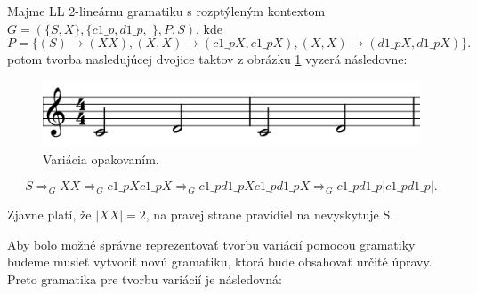 \begin{example}
Majme LL 2-lineárnu gramatiku s rozptýleným kontextom \\ $G = (\{S,X\},\{c1\_p, d1\_p, |\}, P, S)$, kde $$P = \{(S) \rightarrow (XX), (X,X) \rightarrow (c1\_pX, c1\_pX), (X,X) \rightarrow (d1\_pX, d1\_pX)\}.$$ potom tvorba nasledujúcej dvojice taktov z obrázku \ref{fig:Priklad1} vyzerá následovne:
\begin{figure}[H]
    \centering
    \includegraphics[scale=0.4]{thesis/obrazky-figures/Priklad1.png}
    \caption{Variácia opakovaním.}
    \label{fig:Priklad1}
\end{figure}
$$S \Rightarrow_G XX \Rightarrow_G c1\_pXc1\_pX \Rightarrow_G c1\_pd1\_pXc1\_pd1\_pX \Rightarrow_G c1\_pd1\_p|c1\_pd1\_p|.$$

Zjavne platí, že $|XX| = 2$, na pravej strane pravidiel na nevyskytuje S.
\end{example}

Aby bolo možné správne reprezentovať tvorbu variácií pomocou gramatiky budeme musieť vytvoriť novú gramatiku, ktorá bude obsahovať určité úpravy. Preto gramatika pre tvorbu variácií je následovná:

